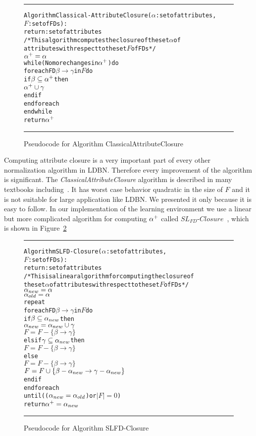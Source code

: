 \begin{figure}[htbp]
\hrule
\begin{alltt}

Algorithm Classical-AttributeClosure(\(\alpha\): set of attributes, 
              \(F\): set of FDs):
           return: set of attributes
/* This algorithm computes the closure of the set \(\alpha\) of
    attributes with respect to the set  \(F\) of FDs */
  \(\alpha\sp{+} = \alpha\)
  while(No more changes in \(\alpha\sp{+}\)) do
    foreach FD \(\beta \rightarrow \gamma\) in \(F\) do
      if \(\beta \subseteq \alpha\sp{+}\) then 
        \(\alpha\sp{+} \cup \gamma\)
      end if
    end foreach
  end while
  return \(\alpha\sp{+}\)
\end{alltt} 
\caption{Pseudocode for Algorithm ClassicalAttributeClosure}\label{fig:attclosure}
\hrule
\end{figure}

Computing attribute closure is a very important part of every other normalization algorithm 
in LDBN. Therefore every improvement 
of the algorithm is significant. 
The \textit{ClassicalAttributeClosure} algorithm is described in many textbooks including~\cite{bdb1, bdb2, bdb4}.
It has worst case behavior quadratic in the size of $F$ and
it is not suitable for large application like LDBN. We presented it only because it is
easy to follow. In our implementation of the learning environment we use a linear but more complicated 
algorithm for computing $\alpha\sp{+}$ 
called $SL_{FD}$-$Closure$~\cite{p10}, which is shown in Figure~\ref{alg:slfdclosure}

\begin{figure}[htbp]
\hrule
\begin{alltt}

Algorithm SLFD-Closure(\(\alpha\): set of attributes, 
              \(F\): set of FDs):
           return: set of attributes
/* This is a linear algorithm for computing the closure of 
  the set \(\alpha\) of attributes with respect to the set \(F\) of FDs */
  \(\alpha\sb{new} = \alpha\)
  \(\alpha\sb{old} = \alpha\)
  repeat
    foreach FD \(\beta \rightarrow \gamma\) in \(F\) do
      if \(\beta \subseteq \alpha\sb{new}\) then 
        \(\alpha\sb{new} = \alpha\sb{new} \cup \gamma\)
        \(F = F - \{\beta \rightarrow \gamma\}\) 
      elsif \(\gamma \subseteq \alpha\sb{new}\) then
        \(F = F - \{\beta \rightarrow \gamma\}\) 
      else
        \(F = F - \{\beta \rightarrow \gamma\}\) 
        \(F = F \cup \{\beta-\alpha\sb{new} \rightarrow \gamma-\alpha\sb{new}\}\) 
      end if
    end foreach 
  until ((\(\alpha\sb{new} = \alpha\sb{old}\)) or \(|F| = 0\))
  return \(\alpha\sp{+} = \alpha\sb{new}\)
\end{alltt} 
\caption{Pseudocode for Algorithm SLFD-Closure}\label{alg:slfdclosure}
\hrule
\end{figure}

